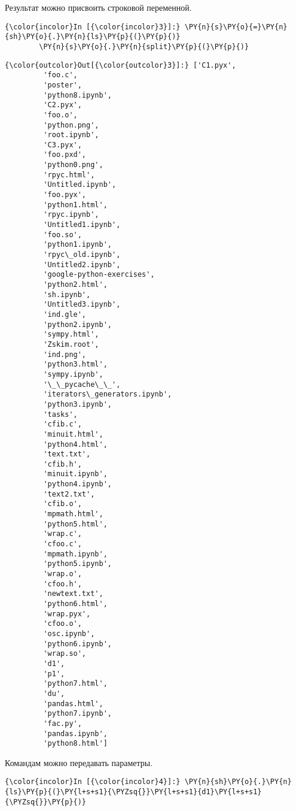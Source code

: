     Результат можно присвоить строковой переменной.

    \begin{Verbatim}[commandchars=\\\{\}]
{\color{incolor}In [{\color{incolor}3}]:} \PY{n}{s}\PY{o}{=}\PY{n}{sh}\PY{o}{.}\PY{n}{ls}\PY{p}{(}\PY{p}{)}
        \PY{n}{s}\PY{o}{.}\PY{n}{split}\PY{p}{(}\PY{p}{)}
\end{Verbatim}


\begin{Verbatim}[commandchars=\\\{\}]
{\color{outcolor}Out[{\color{outcolor}3}]:} ['C1.pyx',
         'foo.c',
         'poster',
         'python8.ipynb',
         'C2.pyx',
         'foo.o',
         'python.png',
         'root.ipynb',
         'C3.pyx',
         'foo.pxd',
         'python0.png',
         'rpyc.html',
         'Untitled.ipynb',
         'foo.pyx',
         'python1.html',
         'rpyc.ipynb',
         'Untitled1.ipynb',
         'foo.so',
         'python1.ipynb',
         'rpyc\_old.ipynb',
         'Untitled2.ipynb',
         'google-python-exercises',
         'python2.html',
         'sh.ipynb',
         'Untitled3.ipynb',
         'ind.gle',
         'python2.ipynb',
         'sympy.html',
         'Zskim.root',
         'ind.png',
         'python3.html',
         'sympy.ipynb',
         '\_\_pycache\_\_',
         'iterators\_generators.ipynb',
         'python3.ipynb',
         'tasks',
         'cfib.c',
         'minuit.html',
         'python4.html',
         'text.txt',
         'cfib.h',
         'minuit.ipynb',
         'python4.ipynb',
         'text2.txt',
         'cfib.o',
         'mpmath.html',
         'python5.html',
         'wrap.c',
         'cfoo.c',
         'mpmath.ipynb',
         'python5.ipynb',
         'wrap.o',
         'cfoo.h',
         'newtext.txt',
         'python6.html',
         'wrap.pyx',
         'cfoo.o',
         'osc.ipynb',
         'python6.ipynb',
         'wrap.so',
         'd1',
         'p1',
         'python7.html',
         'du',
         'pandas.html',
         'python7.ipynb',
         'fac.py',
         'pandas.ipynb',
         'python8.html']
\end{Verbatim}
            
    Командам можно передавать параметры.

    \begin{Verbatim}[commandchars=\\\{\}]
{\color{incolor}In [{\color{incolor}4}]:} \PY{n}{sh}\PY{o}{.}\PY{n}{ls}\PY{p}{(}\PY{l+s+s1}{\PYZsq{}}\PY{l+s+s1}{d1}\PY{l+s+s1}{\PYZsq{}}\PY{p}{)}
\end{Verbatim}


